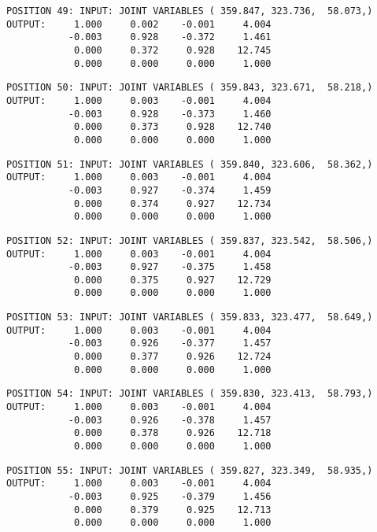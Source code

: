 \begin{verbatim}
POSITION 49: INPUT: JOINT VARIABLES ( 359.847, 323.736,  58.073,)
OUTPUT:     1.000     0.002    -0.001     4.004
           -0.003     0.928    -0.372     1.461
            0.000     0.372     0.928    12.745
            0.000     0.000     0.000     1.000
\end{verbatim} \pagebreak[1]\begin{verbatim}
POSITION 50: INPUT: JOINT VARIABLES ( 359.843, 323.671,  58.218,)
OUTPUT:     1.000     0.003    -0.001     4.004
           -0.003     0.928    -0.373     1.460
            0.000     0.373     0.928    12.740
            0.000     0.000     0.000     1.000
\end{verbatim} \pagebreak[1]\begin{verbatim}
POSITION 51: INPUT: JOINT VARIABLES ( 359.840, 323.606,  58.362,)
OUTPUT:     1.000     0.003    -0.001     4.004
           -0.003     0.927    -0.374     1.459
            0.000     0.374     0.927    12.734
            0.000     0.000     0.000     1.000
\end{verbatim} \pagebreak[1]\begin{verbatim}
POSITION 52: INPUT: JOINT VARIABLES ( 359.837, 323.542,  58.506,)
OUTPUT:     1.000     0.003    -0.001     4.004
           -0.003     0.927    -0.375     1.458
            0.000     0.375     0.927    12.729
            0.000     0.000     0.000     1.000
\end{verbatim} \pagebreak[1]\begin{verbatim}
POSITION 53: INPUT: JOINT VARIABLES ( 359.833, 323.477,  58.649,)
OUTPUT:     1.000     0.003    -0.001     4.004
           -0.003     0.926    -0.377     1.457
            0.000     0.377     0.926    12.724
            0.000     0.000     0.000     1.000
\end{verbatim} \pagebreak[1]\begin{verbatim}
POSITION 54: INPUT: JOINT VARIABLES ( 359.830, 323.413,  58.793,)
OUTPUT:     1.000     0.003    -0.001     4.004
           -0.003     0.926    -0.378     1.457
            0.000     0.378     0.926    12.718
            0.000     0.000     0.000     1.000
\end{verbatim} \pagebreak[1]\begin{verbatim}
POSITION 55: INPUT: JOINT VARIABLES ( 359.827, 323.349,  58.935,)
OUTPUT:     1.000     0.003    -0.001     4.004
           -0.003     0.925    -0.379     1.456
            0.000     0.379     0.925    12.713
            0.000     0.000     0.000     1.000
\end{verbatim} \pagebreak[1]\begin{verbatim}

\end{verbatim}
